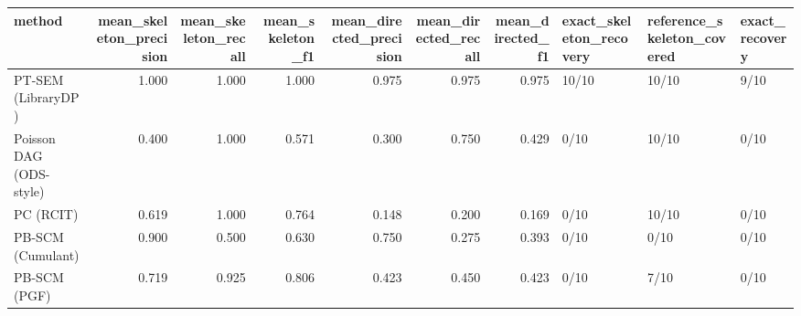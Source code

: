 \begin{tabular}{lrrrrrrlll}
\toprule
method & mean_skeleton_precision & mean_skeleton_recall & mean_skeleton_f1 & mean_directed_precision & mean_directed_recall & mean_directed_f1 & exact_skeleton_recovery & reference_skeleton_covered & exact_recovery \\
\midrule
PT-SEM (LibraryDP) & 1.000 & 1.000 & 1.000 & 0.975 & 0.975 & 0.975 & 10/10 & 10/10 & 9/10 \\
Poisson DAG (ODS-style) & 0.400 & 1.000 & 0.571 & 0.300 & 0.750 & 0.429 & 0/10 & 10/10 & 0/10 \\
PC (RCIT) & 0.619 & 1.000 & 0.764 & 0.148 & 0.200 & 0.169 & 0/10 & 10/10 & 0/10 \\
PB-SCM (Cumulant) & 0.900 & 0.500 & 0.630 & 0.750 & 0.275 & 0.393 & 0/10 & 0/10 & 0/10 \\
PB-SCM (PGF) & 0.719 & 0.925 & 0.806 & 0.423 & 0.450 & 0.423 & 0/10 & 7/10 & 0/10 \\
\bottomrule
\end{tabular}
